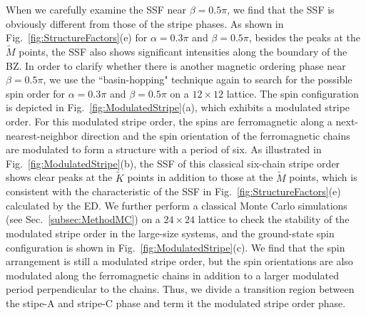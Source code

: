 \documentclass[aps,prb,reprint,amsfonts,amsmath,amssymb,showpacs,groupedaddress,superscriptaddress]{revtex4-1}
\begin{document}
When we carefully examine the SSF near $\beta=0.5\pi$, we find that the SSF is obviously different from those of the stripe phases. As shown in Fig.~\ref{fig:StructureFactors}(e) for $\alpha=0.3\pi$ and $\beta=0.5\pi$, besides the peaks at the $\tilde{M}$ points, the SSF also shows significant intensities along the boundary of the BZ. In order to clarify whether there is another magnetic ordering phase near $\beta=0.5\pi$, we use the ``basin-hopping" technique again to search for the possible spin order for $\alpha=0.3\pi$ and $\beta=0.5\pi$ on a $12 \times 12$ lattice. The spin configuration is depicted in Fig.~\ref{fig:ModulatedStripe}(a), which exhibits a modulated stripe order. For this modulated stripe order, the spins are ferromagnetic along a next-nearest-neighbor direction and the spin orientation of the ferromagnetic chains are modulated to form a structure with a period of six. As illustrated in Fig.~\ref{fig:ModulatedStripe}(b), the SSF of this classical six-chain stripe order shows clear peaks at the $\tilde{K}$ points in addition to those at the $\tilde{M}$ points, which is consistent with the characteristic of the SSF in Fig.~\ref{fig:StructureFactors}(e) calculated by the ED. We further perform a classical Monte Carlo simulations (see Sec.~\ref{subsec:MethodMC}) on a $24 \times24$ lattice to check the stability of the modulated stripe order in the large-size systems, and the ground-state spin configuration is shown in Fig.~\ref{fig:ModulatedStripe}(c). We find that the spin arrangement is still a modulated stripe order, but the spin orientations are also modulated along the ferromagnetic chains in addition to a larger modulated period perpendicular to the chains. Thus, we divide a transition region between the stipe-A and stripe-C phase and term it the modulated stripe order phase.
\end{document}

